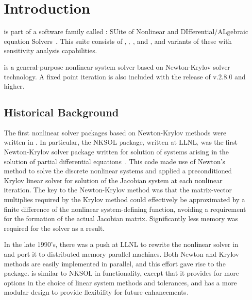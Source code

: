 \chapter{Introduction}\label{s:intro}

{\kinsol} is part of a software family called {\sundials}: SUite
of Nonlinear and DIfferential/ALgebraic equation Solvers~\cite{HBGLSSW:05}. 
This suite consists of {\cvode}, {\arkode}, {\kinsol}, and {\ida}, and variants
of these with sensitivity analysis capabilities.

%
{\kinsol} is a
general-purpose nonlinear system solver based on Newton-Krylov
solver technology.  A fixed point iteration is also included with the release
of {\kinsol} v.2.8.0 and higher.

\section{Historical Background}\label{ss:history}

  The first
nonlinear solver packages based on Newton-Krylov methods were
written in {\F}.  In particular, the NKSOL package, written at
LLNL, was the first Newton-Krylov solver package written for
solution of systems arising in the solution of partial differential
equations~\cite{BrSa:90}.  This {\F} code made use of Newton's
method to solve the discrete nonlinear systems and applied a
preconditioned Krylov linear solver for solution of the Jacobian
system at each nonlinear iteration.  The key to the Newton-Krylov
method was that the matrix-vector multiplies required by the
Krylov method could effectively be approximated by a finite
difference of the nonlinear system-defining function, avoiding a
requirement for the formation of the actual Jacobian matrix.
Significantly less memory was required for the solver as a result.

In the late 1990's, there was a push at LLNL to rewrite the
nonlinear solver in {\CC} and port it to distributed memory
parallel machines.  Both Newton and Krylov methods are easily
implemented in parallel, and this effort gave rise to the
{\kinsol} package. {\kinsol} is similar to NKSOL in functionality,
except that it provides for more options in the choice of linear
system methods and tolerances, and has a more modular design to provide
flexibility for future enhancements.

